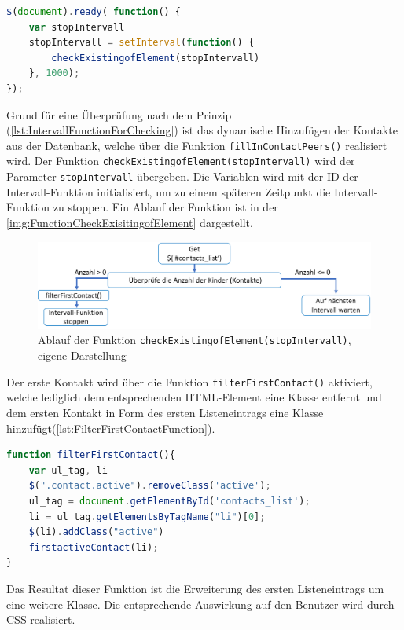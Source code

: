 \documentclass[a4paper,titlepage,halfparskip,12pt]{scrreprt}
\begin{document}
\begin{onehalfspacing}
\begin{lstlisting}[language=Javascript,caption= Ready() Funktion mit der Intervall-Funktion zur Überprüfung der Kontaktliste,label={lst:IntervallFunctionForChecking}]
$(document).ready( function() {
	var stopIntervall 
	stopIntervall = setInterval(function() {
		checkExistingofElement(stopIntervall)
	}, 1000);
});
\end{lstlisting}
Grund für eine Überprüfung nach dem Prinzip (\autoref{lst:IntervallFunctionForChecking}) ist das dynamische Hinzufügen der Kontakte aus der Datenbank, welche über die Funktion \texttt{fillInContactPeers()} realisiert wird. Der Funktion \texttt{checkExistingofElement(stopIntervall)} wird der Parameter \texttt{stopIntervall} übergeben. Die Variablen wird mit der ID der Intervall-Funktion initialisiert, um zu einem späteren Zeitpunkt die Intervall-Funktion zu stoppen. Ein Ablauf der Funktion ist in der \autoref{img:FunctionCheckExisitingofElement} dargestellt.
\begin{figure}[h]
	\centering
	\includegraphics[scale=0.7]{images/FunctionCheckExisitingofElement}
	\caption{Ablauf der Funktion \texttt{checkExistingofElement(stopIntervall)}, eigene Darstellung}
	\label{img:FunctionCheckExisitingofElement}
\end{figure}
Der erste Kontakt wird über die Funktion \texttt{filterFirstContact()} aktiviert, welche lediglich dem entsprechenden \ac{HTML}-Element eine Klasse entfernt und dem ersten Kontakt in Form des ersten Listeneintrags eine Klasse hinzufügt(\autoref{lst:FilterFirstContactFunction}).
\begin{lstlisting}[language=Javascript,caption= \texttt{filterFirstContact}-Funktion,label={lst:FilterFirstContactFunction}]
function filterFirstContact(){
	var ul_tag, li
	$(".contact.active").removeClass('active');
	ul_tag = document.getElementById('contacts_list');
	li = ul_tag.getElementsByTagName("li")[0];
	$(li).addClass("active")
	firstactiveContact(li);  
}
\end{lstlisting}
Das Resultat dieser Funktion ist die Erweiterung des ersten Listeneintrags um eine weitere Klasse. Die entsprechende Auswirkung auf den Benutzer wird durch CSS realisiert.

\end{onehalfspacing}
\end{document}

